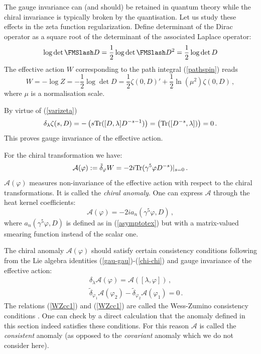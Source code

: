 The gauge invariance can (and should) be retained in quantum
theory while the chiral invariance is typically broken by the
quantisation. Let us study these effects in the zeta function
regularization. Define determinant of the Dirac operator
as a square root of the determinant of the associated
Laplace operator:
\begin{equation}
\log \det \Dir =\frac 12 \log \det \Dir^2
=\frac 12 \log \det D
\label{defdetP}
\end{equation}
The effective action $W$ corresponding to the path integral
(\ref{pathspin}) reads
\begin{equation}
W=-\log Z =-\frac 12 \log \det D
=\frac 12 \zeta (0,D)' +\frac 12 \ln (\mu^2) \zeta (0,D)
\,,
\label{Wspin}
\end{equation}
where $\mu$ is a normalisation scale.

By virtue of (\ref{varizeta})
\begin{equation}
\delta_\lambda \zeta (s,D) =-
\left( s {\rm Tr} ( [D,\lambda ] D^{-s-1}) \right)
=\left( {\rm Tr} ( [D^{-s},\lambda ]) \right)
=0\,.
\end{equation}
This proves gauge invariance of the effective action.

For the chiral transformation we have:
\begin{equation}
\mathcal{A}(\varphi ):=\tilde\delta_{\varphi} W=
-2i{\rm Tr} (\gamma^5\varphi D^{-s})|_{s=0}\,.
\label{chian1}
\end{equation}
$\mathcal{A}(\varphi )$ measures non-invariance of the
effective action with respect to the chiral transformations. It 
is called the {\it chiral anomaly}. One can express $\mathcal{A}$
through the heat kernel coefficients:
\begin{equation}
\mathcal{A}(\varphi )=-2i a_n(\gamma^5\varphi , D) \,,
\label{Ahk}
\end{equation}
where $a_n(\gamma^5\varphi , D)$ is defined as in 
(\ref{asymptotex}) but with a matrix-valued smearing
function instead of the scalar one.

The chiral anomaly $\mathcal{A}(\varphi )$ should satisfy
certain consistency conditions following from the
Lie algebra identities (\ref{gau-gau})-(\ref{chi-chi})
and gauge invariance of the effective action:
\begin{eqnarray}
&&\delta_\lambda \mathcal{ A}(\varphi )=
\mathcal{A}([\lambda ,\varphi ] ) \,, \label{WZcc1}\\
&&\tilde\delta_{\varphi_1} \mathcal{A}(\varphi_2 )-
\tilde\delta_{\varphi_2} \mathcal{A}(\varphi_1 )=0 \,.\label{WZcc2}
\end{eqnarray}
The relations (\ref{WZcc1}) and (\ref{WZcc1}) are called the
Wess-Zumino consistency conditions \cite{Wess:1971yu}.
One can check by a direct calculation that the anomaly
defined in this section indeed satisfies these conditions.
For this reason $\mathcal{A}$ is called the {\it consistent}
anomaly (as opposed to the {\it covariant} anomaly which
we do not consider here).

